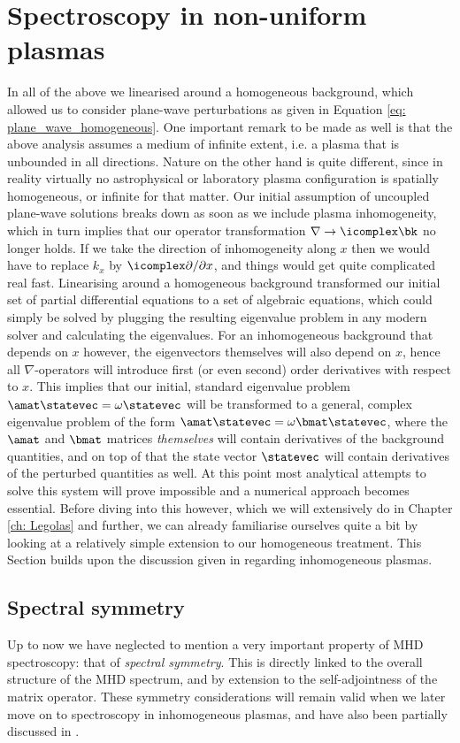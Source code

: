\section{Spectroscopy in non-uniform plasmas}
In all of the above we linearised around a homogeneous background, which allowed us to consider plane-wave perturbations as given in Equation \eqref{eq: plane_wave_homogeneous}. One important remark to be made as well is that the above analysis assumes a medium of infinite extent, i.e. a plasma that is unbounded in all directions.
Nature on the other hand is quite different, since in reality virtually no astrophysical or laboratory plasma configuration is spatially homogeneous, or infinite for that matter. Our initial assumption of uncoupled plane-wave solutions breaks down as soon as we include plasma inhomogeneity, which in turn implies that our operator transformation $\nabla \rightarrow \icomplex\bk$ no longer holds. If we take the direction of inhomogeneity along $x$ then we would have to replace $k_x$ by $\icomplex\partial / \partial x$, and things would get quite complicated real fast. Linearising around a homogeneous background transformed our initial set of partial differential equations to a set of algebraic equations, which could simply be solved by plugging the resulting eigenvalue problem in any modern solver and calculating the eigenvalues. For an inhomogeneous background that depends on $x$ however, the eigenvectors themselves will also depend on $x$, hence all $\nabla$-operators will introduce first (or even second) order derivatives with respect to $x$. This implies that our initial, standard eigenvalue problem $\amat \statevec = \omega \statevec$ will be transformed to a general, complex eigenvalue problem of the form $\amat \statevec = \omega \bmat \statevec$, where the $\amat$ and $\bmat$ matrices \emph{themselves} will contain derivatives of the background quantities, and on top of that the state vector $\statevec$ will contain derivatives of the perturbed quantities as well. At this point most analytical attempts to solve this system will prove impossible and a numerical approach becomes essential.
Before diving into this however, which we will extensively do in Chapter \ref{ch: Legolas} and further, we can already familiarise ourselves quite a bit by looking at a relatively simple extension to our homogeneous treatment. This Section builds upon the discussion given in \citet{book_MHD} regarding inhomogeneous plasmas.

\subsection{Spectral symmetry}
Up to now we have neglected to mention a very important property of MHD spectroscopy: that of \emph{spectral symmetry}. This is directly linked to the overall structure of the MHD spectrum, and by extension to the self-adjointness of the matrix operator. These symmetry considerations will remain valid when we later move on to spectroscopy in inhomogeneous plasmas, and have also been partially discussed in \citet{claes2020_legolas}.

